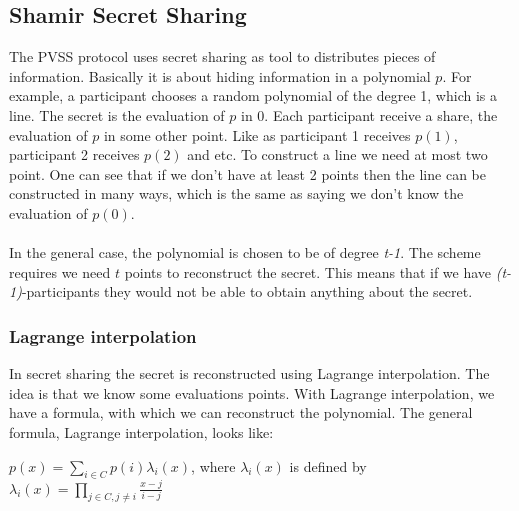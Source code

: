 \subsection{Shamir Secret Sharing}
The PVSS protocol uses secret sharing as tool to distributes pieces of information. Basically it is about hiding information in a polynomial \begin{math}p\end{math}. For example, a participant chooses a random polynomial of the degree 1, which is a line. The secret is the evaluation of $p$ in \begin{math}0\end{math}. Each participant receive a share, the evaluation of  \begin{math}p\end{math} in some other point. Like as participant  1 receives  \begin{math}p(1)\end{math}, participant 2 receives \begin{math}p(2)\end{math} and etc. To construct a line we need at most two point. One can see that if we don’t have at least 2 points then the line can be constructed in many ways, which is the same as saying we don’t know the evaluation of \begin{math}p(0)\end{math}.\\ \\
In the general case, the polynomial is chosen to be of degree \textit{t-1}. The scheme requires we need 
 \begin{math}t\end{math} points to reconstruct the secret. This means that if we have \textit{(t-1)}-participants they would not be able to obtain anything about the secret. 

\subsubsection{Lagrange interpolation} \label{sec:shamir_secret_sharing_lagrange_interpolation}
In secret sharing the secret is reconstructed using Lagrange interpolation. The idea is that we know some evaluations points. With Lagrange interpolation, we have a formula, with which we can reconstruct the polynomial.
The general formula, Lagrange interpolation, looks like:

\begin{defi}
\begin{math}p(x)=\sum\limits_{i \in C} p(i)\lambda_i(x)\end{math}, where $\lambda_i(x)$ is defined by \begin{math} \lambda_i(x)=\prod\limits_{j\in C,j\neq i}  \frac{x-j}{i-j} \end{math}
\end{defi}

